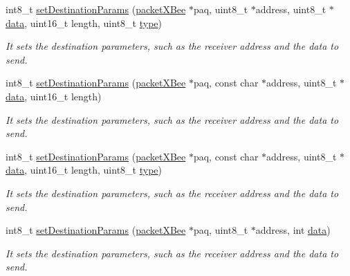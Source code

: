 \begin{DoxyCompactItemize}
int8\+\_\+t \hyperlink{class_wasp_x_bee_core_ac7b8dcd1b4a66051386f37171f319e95}{set\+Destination\+Params} (\hyperlink{structpacket_x_bee}{packet\+X\+Bee} $\ast$paq, uint8\+\_\+t $\ast$address, uint8\+\_\+t $\ast$\hyperlink{class_wasp_x_bee_core_a81f1c2af5c45fc8e3b63f8f21b3df17f}{data}, uint16\+\_\+t length, uint8\+\_\+t \hyperlink{_sd_fat_structs_8h_a1d127017fb298b889f4ba24752d08b8e}{type})
\begin{DoxyCompactList}\small\item\em It sets the destination parameters, such as the receiver address and the data to send. \end{DoxyCompactList}\item 
int8\+\_\+t \hyperlink{class_wasp_x_bee_core_a875a7de0ff73f92598cfe573ccd747df}{set\+Destination\+Params} (\hyperlink{structpacket_x_bee}{packet\+X\+Bee} $\ast$paq, const char $\ast$address, uint8\+\_\+t $\ast$\hyperlink{class_wasp_x_bee_core_a81f1c2af5c45fc8e3b63f8f21b3df17f}{data}, uint16\+\_\+t length)
\begin{DoxyCompactList}\small\item\em It sets the destination parameters, such as the receiver address and the data to send. \end{DoxyCompactList}\item 
int8\+\_\+t \hyperlink{class_wasp_x_bee_core_a03ba3ba8d7406b67ff5acd642a4c5fe4}{set\+Destination\+Params} (\hyperlink{structpacket_x_bee}{packet\+X\+Bee} $\ast$paq, const char $\ast$address, uint8\+\_\+t $\ast$\hyperlink{class_wasp_x_bee_core_a81f1c2af5c45fc8e3b63f8f21b3df17f}{data}, uint16\+\_\+t length, uint8\+\_\+t \hyperlink{_sd_fat_structs_8h_a1d127017fb298b889f4ba24752d08b8e}{type})
\begin{DoxyCompactList}\small\item\em It sets the destination parameters, such as the receiver address and the data to send. \end{DoxyCompactList}\item 
int8\+\_\+t \hyperlink{class_wasp_x_bee_core_aa2d37826b4db11e45fc875553cbdb832}{set\+Destination\+Params} (\hyperlink{structpacket_x_bee}{packet\+X\+Bee} $\ast$paq, uint8\+\_\+t $\ast$address, int \hyperlink{class_wasp_x_bee_core_a81f1c2af5c45fc8e3b63f8f21b3df17f}{data})
\begin{DoxyCompactList}\small\item\em It sets the destination parameters, such as the receiver address and the data to send. \end{DoxyCompactList}\item 

\end{DoxyCompactItemize}
